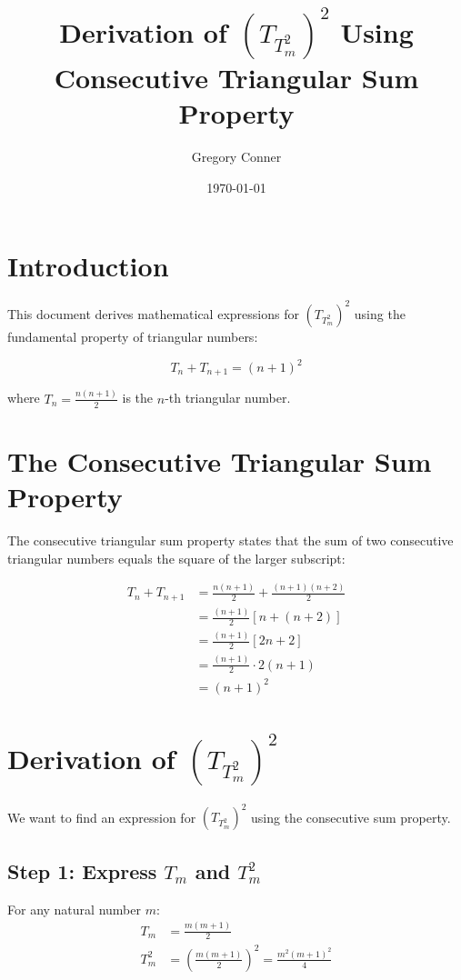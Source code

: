 \documentclass{article}
\title{Derivation of $(T_{T_m^2})^2$ Using Consecutive Triangular Sum Property}
\author{Gregory Conner}
\date{\today}
\begin{document}
\maketitle

\section{Introduction}

This document derives mathematical expressions for $(T_{T_m^2})^2$ using the fundamental property of triangular numbers:

\begin{equation}
T_n + T_{n+1} = (n+1)^2
\end{equation}

where $T_n = \frac{n(n+1)}{2}$ is the $n$-th triangular number.

\section{The Consecutive Triangular Sum Property}

The consecutive triangular sum property states that the sum of two consecutive triangular numbers equals the square of the larger subscript:

\begin{align}
T_n + T_{n+1} &= \frac{n(n+1)}{2} + \frac{(n+1)(n+2)}{2} \\
&= \frac{(n+1)}{2}[n + (n+2)] \\
&= \frac{(n+1)}{2}[2n+2] \\
&= \frac{(n+1)}{2} \cdot 2(n+1) \\
&= (n+1)^2
\end{align}

\section{Derivation of $(T_{T_m^2})^2$}

We want to find an expression for $(T_{T_m^2})^2$ using the consecutive sum property.

\subsection{Step 1: Express $T_m$ and $T_m^2$}

For any natural number $m$:
\begin{align}
T_m &= \frac{m(m+1)}{2} \\
T_m^2 &= \left(\frac{m(m+1)}{2}\right)^2 = \frac{m^2(m+1)^2}{4}
\end{align}
\end{document}

